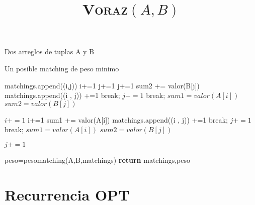 \documentclass{article}
\begin{document}
\begin{algorithmic}[1]

\Require Dos arreglos de tuplas A y B
  
\Ensure Un posible matching de peso minimo$$$$
 \title{\textsc{Voraz}$(A,B)$}
        \state matchings.append((i,j))
            \state i+=1
        \EndIf
            \state j+=1
        \Else
                \state j+=1
                \state sum2 += valor(B[j])
                    \state matchings.append((i , j))
                    \statei+=1
                        \state break;
                    \EndIf
                    \state $j+=1$
                        \state break;
                    \EndIf
                    \state $sum1 = valor(A[i])$
                    \state $sum2 = valor(B[j])$
                \EndIf
            
                        
            \Else
                \state $i+=1$
            \EndIf
            \EndIf
                \state i+=1
                \state sum1 += valor(A[i])
                    \state matchings.append((i , j))
                    \statei+=1
                        \state break;
                    \EndIf
                    \state $j+=1$
                        \state break;
                    \EndIf
                    \state $sum1 = valor(A[i])$
                    \state $sum2 = valor(B[j])$
                \EndIf
            
                        
            \Else
                \state $j+=1$
            \EndIf
            
            \EndIf
            \EndIf
            \state peso=pesomatching(A,B,matchings)
            \State \textbf{return} matchings,peso

                
\end{algorithmic}

\section{Recurrencia OPT}
\end{document}
